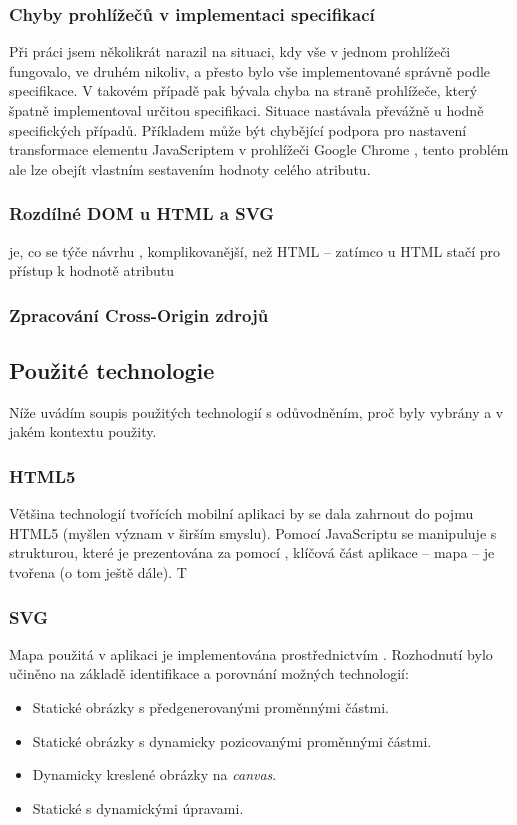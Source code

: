 \subsubsection{Chyby prohlížečů v implementaci specifikací}
Při práci jsem několikrát narazil na situaci, kdy vše v jednom prohlížeči fungovalo, ve druhém nikoliv, a přesto bylo vše implementované správně podle specifikace. V takovém případě pak bývala chyba na straně prohlížeče, který špatně implementoval určitou specifikaci. Situace nastávala převážně u hodně specifických případů. Příkladem může být chybějící podpora pro nastavení transformace  elementu JavaScriptem v prohlížeči Google Chrome \cite{BugChromeTran}, tento problém ale lze obejít vlastním sestavením hodnoty celého atributu. 

\subsubsection{Rozdílné DOM u HTML a SVG}
 je, co se týče návrhu , komplikovanější, než HTML -- zatímco u HTML stačí pro přístup k hodnotě atributu 

\subsubsection{Zpracování Cross-Origin zdrojů}
\label{sec:cross-origin}


\subsection{Použité technologie}
Níže uvádím soupis použitých technologií s odůvodněním, proč byly vybrány a v jakém kontextu použity.

\subsubsection{HTML5}
Většina technologií tvořících mobilní aplikaci by se dala zahrnout do pojmu HTML5 (myšlen význam v širším smyslu). Pomocí JavaScriptu se manipuluje s  strukturou, které je prezentována za pomocí , klíčová část aplikace -- mapa -- je tvořena  (o tom ještě dále). T

\subsubsection{SVG}
Mapa použitá v aplikaci je implementována prostřednictvím . Rozhodnutí bylo učiněno na základě identifikace a porovnání možných technologií:
\begin{itemize}
 \item Statické obrázky s předgenerovanými proměnnými částmi.
 \item Statické obrázky s dynamicky pozicovanými proměnnými částmi.
 \item Dynamicky kreslené obrázky na \textit{canvas}.
 \item Statické  s dynamickými úpravami.
\end{itemize}

